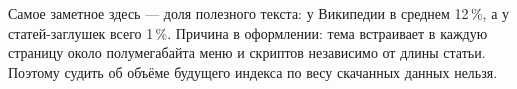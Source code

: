 Самое заметное здесь --- доля полезного текста: у Википедии в среднем 12\,\%, а у
статей-заглушек всего 1\,\%. Причина в оформлении: тема встраивает в каждую страницу
около полумегабайта меню и скриптов независимо от длины статьи. Поэтому судить об объёме
будущего индекса по весу скачанных данных нельзя.

\pagebreak
